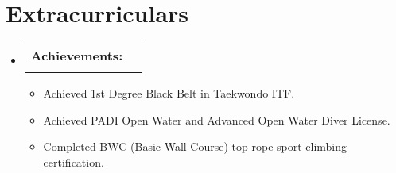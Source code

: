 \documentclass[letterpaper,11pt]{article}
\makeatletter
\newcommand{\resumeItem}[1]{
  \item\small{
    {#1 \vspace{-2pt}}
  }
}
\newcommand{\resumeSubheading}[4]{
  \vspace{-2pt}\item
    \begin{tabular*}{0.97\textwidth}[t]{l@{\extracolsep{\fill}}r}
      \textbf{#1} & #2 \\
      \textit{\small#3} & \textit{\small #4} \\
    \end{tabular*}\vspace{-7pt}
}
\newcommand{\resumeSubHeadingListStart}{\begin{itemize}[leftmargin=0.15in, label={}]}
\newcommand{\resumeSubHeadingListEnd}{\end{itemize}}
\newcommand{\resumeItemListStart}{\begin{itemize}}
\newcommand{\resumeItemListEnd}{\end{itemize}\vspace{-8pt}}
\makeatother
\begin{document}



\section{Extracurriculars}

    \resumeSubHeadingListStart
      \resumeSubheading
      {Achievements:}{}
      {}{}
      \resumeItemListStart
      \vspace{-5mm}
        \resumeItem{Achieved 1st Degree Black Belt in Taekwondo ITF.}
        \resumeItem{Achieved PADI Open Water and Advanced Open Water Diver License.}
        \resumeItem{Completed BWC (Basic Wall Course) top rope sport climbing certification.}
      \resumeItemListEnd
    \resumeSubHeadingListEnd
\end{document}
